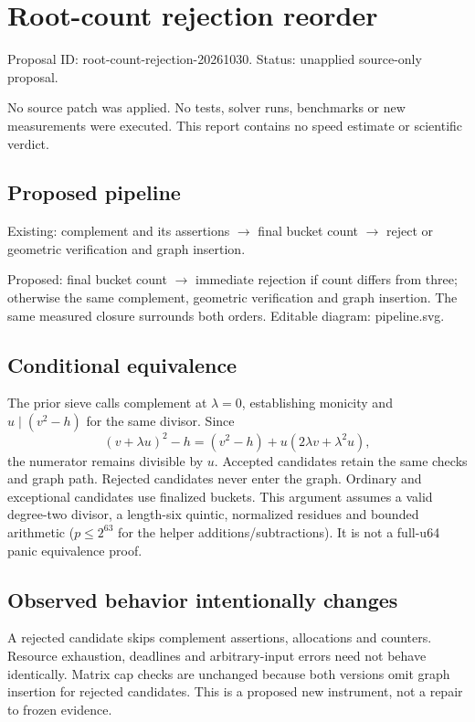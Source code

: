\documentclass[11pt]{article}
\begin{document}
\section*{Root-count rejection reorder}
Proposal ID: root-count-rejection-20261030. Status: unapplied source-only proposal.\par
No source patch was applied. No tests, solver runs, benchmarks or new measurements were executed. This report contains no speed estimate or scientific verdict.
\subsection*{Proposed pipeline}
Existing: complement and its assertions $\to$ final bucket count $\to$ reject or geometric verification and graph insertion.\par
Proposed: final bucket count $\to$ immediate rejection if count differs from three; otherwise the same complement, geometric verification and graph insertion. The same measured closure surrounds both orders. Editable diagram: pipeline.svg.
\subsection*{Conditional equivalence}
The prior sieve calls complement at $\lambda=0$, establishing monicity and $u\mid(v^2-h)$ for the same divisor. Since
\[
(v+\lambda u)^2-h=(v^2-h)+u(2\lambda v+\lambda^2u),
\]
the numerator remains divisible by $u$. Accepted candidates retain the same checks and graph path. Rejected candidates never enter the graph. Ordinary and exceptional candidates use finalized buckets.
This argument assumes a valid degree-two divisor, a length-six quintic, normalized residues and bounded arithmetic ($p\leq2^{63}$ for the helper additions/subtractions). It is not a full-u64 panic equivalence proof.
\subsection*{Observed behavior intentionally changes}
A rejected candidate skips complement assertions, allocations and counters. Resource exhaustion, deadlines and arbitrary-input errors need not behave identically. Matrix cap checks are unchanged because both versions omit graph insertion for rejected candidates. This is a proposed new instrument, not a repair to frozen evidence.
\end{document}
